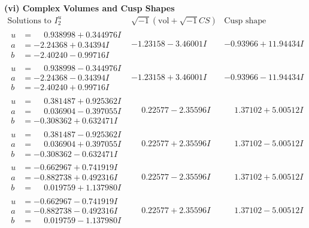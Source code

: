 \documentclass[1p]{elsarticle_modified}
\theoremstyle{definition}
\newcommand{\I}{\sqrt{-1}}
\begin{document}
\newpage\flushleft \textbf{(vi) Complex Volumes and Cusp Shapes}
$$\begin{array}{c|c|c}  
\text{Solutions to }I^u_{2}& \I (\text{vol} + \sqrt{-1}CS) & \text{Cusp shape}\\
 \hline 
\begin{aligned}
u &= \phantom{-}0.938998 + 0.344976 I \\
a &= -2.24368 + 0.34394 I \\
b &= -2.40240 - 0.99716 I\end{aligned}
 & -1.23158 - 3.46001 I & -0.93966 + 11.94434 I \\ \hline\begin{aligned}
u &= \phantom{-}0.938998 - 0.344976 I \\
a &= -2.24368 - 0.34394 I \\
b &= -2.40240 + 0.99716 I\end{aligned}
 & -1.23158 + 3.46001 I & -0.93966 - 11.94434 I \\ \hline\begin{aligned}
u &= \phantom{-}0.381487 + 0.925362 I \\
a &= \phantom{-}0.036904 - 0.397055 I \\
b &= -0.308362 + 0.632471 I\end{aligned}
 & \phantom{-}0.22577 - 2.35596 I & \phantom{-}1.37102 + 5.00512 I \\ \hline\begin{aligned}
u &= \phantom{-}0.381487 - 0.925362 I \\
a &= \phantom{-}0.036904 + 0.397055 I \\
b &= -0.308362 - 0.632471 I\end{aligned}
 & \phantom{-}0.22577 + 2.35596 I & \phantom{-}1.37102 - 5.00512 I \\ \hline\begin{aligned}
u &= -0.662967 + 0.741919 I \\
a &= -0.882738 + 0.492316 I \\
b &= \phantom{-}0.019759 + 1.137980 I\end{aligned}
 & \phantom{-}0.22577 - 2.35596 I & \phantom{-}1.37102 + 5.00512 I \\ \hline\begin{aligned}
u &= -0.662967 - 0.741919 I \\
a &= -0.882738 - 0.492316 I \\
b &= \phantom{-}0.019759 - 1.137980 I\end{aligned}
 & \phantom{-}0.22577 + 2.35596 I & \phantom{-}1.37102 - 5.00512 I \\ \hline\begin{aligned}

\end{aligned}
\end{array}$$
\end{document}
